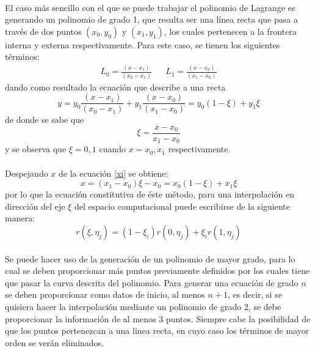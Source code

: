 \documentclass[letterpaper, openright, 12pt]{book}
\begin{document}
			\paragraph*{}
				El caso más sencillo con el que se puede trabajar el polinomio de Lagrange es generando un polinomio de grado 1, que resulta ser una línea recta que pasa a través de dos puntos $(x_{0} , y_{0})$ y $(x_{1}, y_{1})$, los cuales pertenecen a la frontera interna y externa respectivamente. Para este caso, se tienen los siguientes términos:
				\begin{align*}
					L_{0} = \frac{ ( x - x_{1} ) }{ (x_{0} - x_{1} ) } && L_{1} = \frac{ ( x - x_{0} ) }{ (x_{1} - x_{0} ) }
				\end{align*}
				dando como resultado la ecuación que describe a una recta
				\begin{equation}
					y = y_{0} \frac{ ( x - x_{1} ) }{ ( x_{0} - x_{1} ) }  + y_{1} \frac{ (x - x_{0})  }{( x_{1} - x_{0} )} = y_{0} (1 - \xi) + y_{1}\xi
				\end{equation}
				de donde se sabe que
				\begin{equation}
					\xi = \frac{x - x_{0}}{x_{1} - x_{0}}
					\label{xi}
				\end{equation}
				y se observa que $\xi = 0, 1$ cuando $x = x_{0}, x_{1}$ respectivamente.
			\paragraph*{}
				Despejando $x$ de la ecuación \ref{xi} se obtiene:
				\begin{equation}
					x = (x_{1} - x_{0})\xi - x_{0} = x_{0}(1 - \xi) + x_{1}\xi
				\end{equation}
				por lo que la ecuación constitutiva de éste método, para una interpolación en dirección del eje $\xi$ del espacio computacional puede escribirse de la siguiente manera:
				\begin{equation}
					r(\xi, \eta_{j}) = (1 - \xi_{i}) r(0, \eta_{j}) + \xi_{i}r(1, \eta_{j})
				\end{equation}
				
			\paragraph*{}
				Se puede hacer uso de la generación de un polinomio de mayor grado, para lo cual se deben proporcionar más puntos previamente definidos por los cuales tiene que pasar la curva descrita del polinomio. Para generar una ecuación de grado $n$ se deben proporcionar como datos de inicio, al menos $n+1$, es decir, si se quisiera hacer la interpolación mediante un polinomio de grado 2, se debe proporcionar la información de al menos 3 puntos. Siempre cabe la posibilidad de que los puntos pertenezcan a una linea recta, en cuyo caso los términos de mayor orden se verán eliminados.
\end{document}
